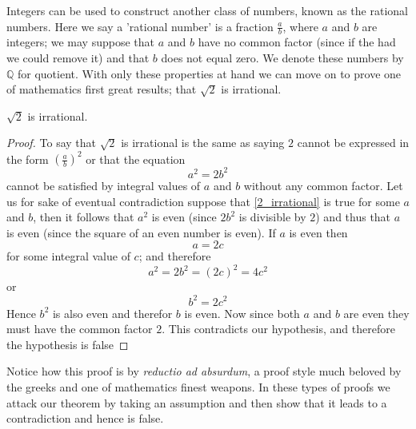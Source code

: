 Integers can be used to construct another class of numbers, known as the
rational numbers. Here we say a 'rational number' is a fraction $\frac{a}{b}$,
where $a$ and $b$ are integers; we may suppose that $a$ and $b$ have no common
factor (since if the had we could remove it) and that $b$ does not equal zero.
We denote these numbers by $\mathbb{Q}$ for quotient. With only these
properties at hand we can move on to prove one of mathematics first great
results; that $\sqrt{2}$ is irrational.
\begin{proposition}
$\sqrt{2}$ is irrational.
\end{proposition}
\begin{proof}
To say that $\sqrt{2}$ is irrational is the same as saying $2$ cannot be
expressed in the form $\left(\frac{a}{b}\right)^2$ or that the equation
\begin{equation}\label{2_irrational}
a^2 = 2b^2
\end{equation}
cannot be satisfied by integral values of $a$ and $b$ without any common factor.
Let us for sake of eventual contradiction suppose that \ref{2_irrational} is
true for some $a$ and $b$, then it follows that $a^2$ is even (since $2b^2$ is
divisible by $2$) and thus that $a$ is even (since the square of an even number
is even). If $a$ is even then
\[
a = 2c
\]
for some integral value of $c$; and therefore
\[
 a^2 = 2b^2 = (2c)^2 = 4c^2
\]
or
\[
b^2 = 2c^2
\]
Hence $b^2$ is also even and therefor $b$ is even. Now since both $a$ and $b$
are even they must have the common factor $2$. This contradicts our hypothesis,
and therefore the hypothesis is false
\end{proof}
Notice how this proof is by \emph{reductio ad absurdum}, a proof style much
beloved by the greeks and one of mathematics finest weapons. In these types of
proofs we attack our theorem by taking an assumption and then show that it
leads to a contradiction and hence is false.

